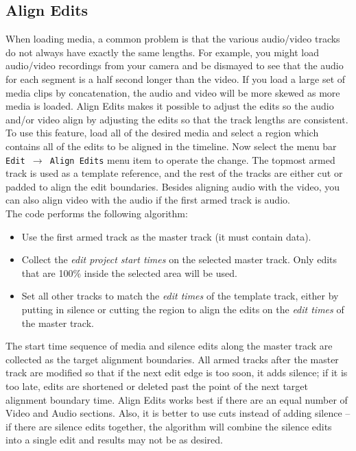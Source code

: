 \subsection{Align Edits}%
\label{sub:align_edits}

When loading media, a common problem is that the various audio/video tracks do not always have exactly the same lengths. For example, you might load audio/video recordings from your camera and be dismayed to see that the audio for each segment is a half second longer than the video. If you load a large set of media clips by concatenation, the audio and video will be more skewed as more media is loaded. Align Edits makes it possible to adjust the edits so the audio and/or video align by adjusting 
the edits so that the track lengths are consistent. To use this feature, load all of the desired media and select a region which contains all of the edits to be aligned in the timeline. Now select the menu bar \texttt{Edit $\rightarrow$ Align Edits} menu item to operate the change. The topmost armed track is used as a template reference, and the rest of the tracks are either cut or padded to align the edit boundaries.  Besides aligning audio with the video, you can also align video with the audio if the first armed track is audio. \\
The code performs the following algorithm:
\begin{itemize}
    \item Use the first armed track as the master track (it must contain data).
    \item Collect the \textit{edit project start times} on the selected master track. Only edits that are 100\% inside the selected area will be used.
    \item Set all other tracks to match the \textit{edit times} of the template track, either by putting in silence or cutting the region to align the edits on the \textit{edit times} of the master track.
\end{itemize}
The start time sequence of media and silence edits along the master track are collected as the target 
alignment boundaries. All armed tracks after the master track are modified so that if the next edit edge 
is too soon, it adds silence; if it is too late, edits are shortened or deleted past the point of the next target
alignment boundary time.  Align Edits works best if there are an equal number of Video and Audio sections.  Also, it is better to use cuts instead of adding silence -- if there are silence edits together, the algorithm will combine the silence edits into a single edit and results may not be as desired.

